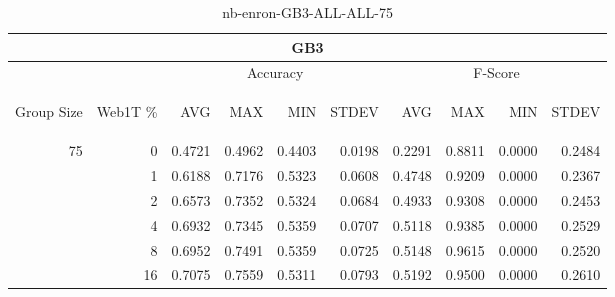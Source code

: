\begin{center}
\begin{table}[htbp]
\begin{tabular}{ | r | r | r | r | r | r | r | r | r | r |}
\hline
\multicolumn{10}{|c|}{GB3}\\
\hline
 & & \multicolumn{4}{|c|}{Accuracy} & \multicolumn{4}{|c|}{F-Score}\\ \cline{3-10}
\begin{sideways}Group Size\end{sideways} & \begin{sideways}Web1T \%\end{sideways} & \begin{sideways}AVG\end{sideways} & \begin{sideways}MAX\end{sideways} & \begin{sideways}MIN\end{sideways} & \begin{sideways}STDEV\end{sideways} & \begin{sideways}AVG\end{sideways} & \begin{sideways}MAX\end{sideways} & \begin{sideways}MIN\end{sideways} & \begin{sideways}STDEV\end{sideways}\\
\hline
\multirow{5}{*}{75}
 & 0 & 0.4721 & 0.4962 & 0.4403 & 0.0198 & 0.2291 & 0.8811 & 0.0000 & 0.2484\\ \cline{2-10}
 & 1 & 0.6188 & 0.7176 & 0.5323 & 0.0608 & 0.4748 & 0.9209 & 0.0000 & 0.2367\\ \cline{2-10}
 & 2 & 0.6573 & 0.7352 & 0.5324 & 0.0684 & 0.4933 & 0.9308 & 0.0000 & 0.2453\\ \cline{2-10}
 & 4 & 0.6932 & 0.7345 & 0.5359 & 0.0707 & 0.5118 & 0.9385 & 0.0000 & 0.2529\\ \cline{2-10}
 & 8 & 0.6952 & 0.7491 & 0.5359 & 0.0725 & 0.5148 & 0.9615 & 0.0000 & 0.2520\\ \cline{2-10}
 & 16 & 0.7075 & 0.7559 & 0.5311 & 0.0793 & 0.5192 & 0.9500 & 0.0000 & 0.2610\\ \cline{2-10}
\hline
\end{tabular}
\caption{nb-enron-GB3-ALL-ALL-75}
\label{table:nb-enron-GB3-ALL-ALL-75}
\end{table}
\end{center}

